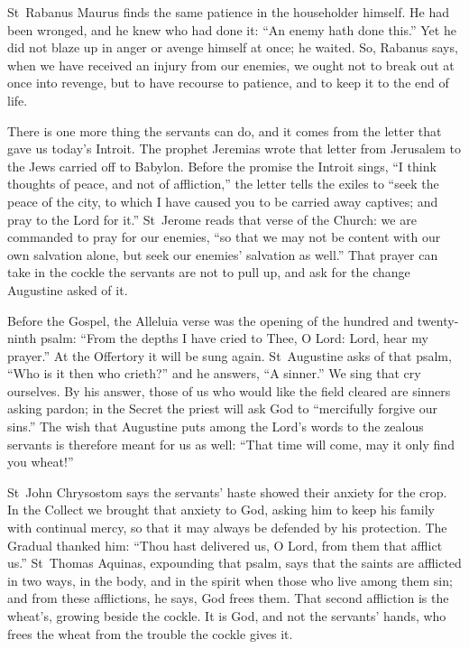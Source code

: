 St~Rabanus Maurus finds the same patience in the householder himself. He had
been wronged, and he knew who had done it: ``An enemy hath done this.'' Yet he
did not blaze up in anger or avenge himself at once; he waited. So, Rabanus
says, when we have received an injury from our enemies, we ought not to break
out at once into revenge, but to have recourse to patience, and to keep it to
the end of life.

There is one more thing the servants can do, and it comes from the letter
that gave us today's Introit. The prophet Jeremias wrote that letter from
Jerusalem to the Jews carried off to Babylon. Before the promise the Introit
sings, ``I think thoughts of peace, and not of affliction,'' the letter tells
the exiles to ``seek the peace of the city, to which I have caused you to be
carried away captives; and pray to the Lord for it.'' St~Jerome reads that
verse of the Church: we are commanded to pray for our enemies, ``so that we may not be content with our
own salvation alone, but seek our enemies' salvation as well.'' That prayer
can take in the cockle the servants are not to pull up, and ask for the change
Augustine asked of it.

Before the Gospel, the Alleluia verse was the opening of the hundred and
twenty-ninth psalm: ``From the depths I have cried to Thee, O Lord: Lord, hear
my prayer.'' At the Offertory it will be sung again. St~Augustine asks of that
psalm, ``Who is it then who crieth?'' and he answers, ``A sinner.'' We sing
that cry ourselves. By his answer, those of us who would like the field
cleared are sinners asking pardon; in the Secret the priest will ask God to
``mercifully forgive our sins.'' The wish that Augustine puts among the Lord's
words to the zealous servants is therefore meant for us as well: ``That time
will come, may it only find you wheat!''

St~John Chrysostom says the servants' haste showed their anxiety for the
crop. In the Collect we brought that anxiety to God, asking him to keep his
family with continual mercy, so that it may always be defended by his
protection. The Gradual thanked him: ``Thou hast delivered us, O Lord, from
them that afflict us.'' St~Thomas Aquinas, expounding that psalm, says that
the saints are afflicted in two ways, in the body, and in the spirit when
those who live among them sin; and from these afflictions, he says, God frees
them. That second affliction is the wheat's, growing beside the cockle. It is
God, and not the servants' hands, who frees the wheat from the trouble the
cockle gives it.

